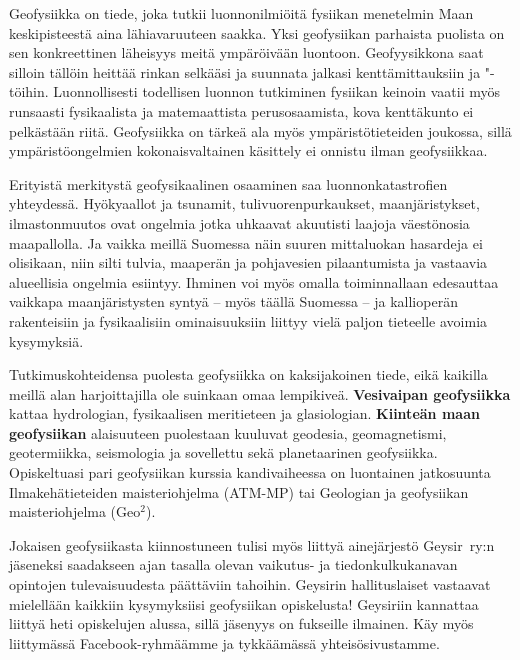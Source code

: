 \documentclass[../ala_hataile.tex]{subfiles}
\begin{document}
\clearpage

Geofysiikka on tiede, joka tutkii luonnon\-ilmiöitä fysiikan menetelmin Maan keski\-pisteestä aina lähi\-avaruuteen saakka. Yksi geo\-fysiikan parhaista puolista on sen konkreettinen läheisyys meitä ympäröivään luontoon. Geofyysikkona saat silloin tällöin heittää rinkan selkääsi ja suunnata jalkasi kenttä\-mittauksiin ja "-töihin. Luonnollisesti todellisen luonnon tutkiminen fysiikan keinoin vaatii myös runsaasti fysikaalista ja matemaattista perusosaamista, kova kenttä\-kunto ei pelkästään riitä. Geofysiikka on tärkeä ala myös ympäristötieteiden joukossa, sillä ympäristö\-ongelmien kokonaisvaltainen käsittely ei onnistu ilman geofysiikkaa.

Erityistä merkitystä geofysikaalinen osaaminen saa luonnonkatastrofien yhteydessä. Hyökyaallot ja tsunamit, tulivuorenpurkaukset, maanjäristykset, ilmastonmuutos ovat ongelmia jotka uhkaavat akuutisti laajoja väestönosia maapallolla. Ja vaikka meillä Suomessa näin suuren mittaluokan hasardeja ei olisikaan, niin silti tulvia, maaperän ja pohjavesien pilaantumista ja vastaavia alueellisia ongelmia esiintyy. Ihminen voi myös omalla toiminnallaan edes\-auttaa vaikkapa maanjäristysten syntyä -- myös täällä Suomessa -- ja kallioperän rakenteisiin ja fysikaalisiin ominaisuuksiin liittyy vielä paljon tieteelle avoimia kysymyksiä.

Tutkimuskohteidensa puolesta geofysiikka on kaksijakoinen tiede, eikä kaikilla meillä alan harjoittajilla ole suinkaan omaa lempikiveä. \textbf{Vesivaipan geofysiikka} kattaa hydrologian, fysikaalisen meritieteen ja glasiologian. \textbf{Kiinteän maan geofysiikan} alaisuuteen puolestaan kuuluvat geodesia, geomagnetismi, geotermiikka, seismologia ja sovellettu sekä planetaarinen geofysiikka. Opiskeltuasi pari geofysiikan kurssia kandivaiheessa on luontainen jatkosuunta Ilmakehätieteiden maisteriohjelma (ATM-MP) tai Geologian ja geofysiikan maisteriohjelma (Geo$^2$).

Jokaisen geofysiikasta kiinnostuneen
tulisi myös liittyä ainejärjestö Geysir~ry:n
jäseneksi saadakseen ajan tasalla olevan
vaikutus- ja tiedonkulkukanavan opintojen
tulevaisuudesta päättäviin tahoihin. Geysirin
hallituslaiset vastaavat mielellään kaikkiin
kysymyksiisi geofysiikan opiskelusta! Geysiriin kannattaa liittyä heti opiskelujen alussa, sillä jäsenyys on fukseille ilmainen. Käy myös liittymässä Facebook-ryhmäämme ja tykkäämässä yhteisösivustamme.
\end{document}
